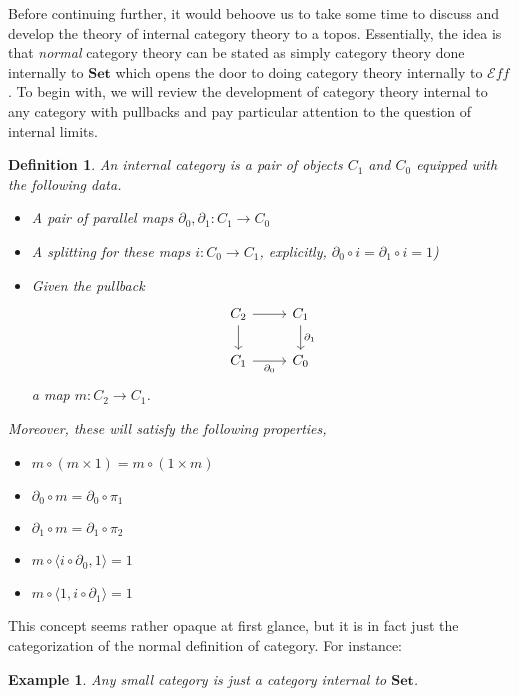 \documentclass[12pt]{amsart}
\newcommand{\cat}[1]{\ensuremath{\mathbf{#1}}}
\newcommand{\set}{\cat{Set}}
\newcommand{\eff}{\mathcal{E}\!f\!f}
\newtheorem{example}[thm]{Example}
\newtheorem{defn}[thm]{Definition}
\begin{document}
Before continuing further, it would behoove us to take some time to
discuss and develop the theory of internal category theory to a
topos. Essentially, the idea is that \emph{normal} category theory can
be stated as simply category theory done internally to $\set$ which
opens the door to doing category theory internally to $\eff$. To begin
with, we will review the development of category theory internal to
any category with pullbacks and pay particular attention to the
question of internal limits.
\begin{defn}\label{defn:internal:internalcat}
  An internal category is a pair of objects $C_1$ and $C_0$ equipped
  with the following data.
  \begin{itemize}
  \item A pair of parallel maps $\partial_0, \partial_1 : C_1 \to C_0$
  \item A splitting for these maps $i : C_0 \to C_1$, explicitly,
    $\partial_0 \circ i = \partial_1 \circ i = 1$)
  \item Given the pullback
    \[
      \begin{tikzcd}
        C_2 \ar[r] \ar[d] & C_1 \ar[d, "\partial_1"]\\
        C_1 \ar[r, swap, "\partial_0"] & C_0
      \end{tikzcd}
    \]
    a map $m : C_2 \to C_1$.
  \end{itemize}
  Moreover, these will satisfy the following properties,
  \begin{itemize}
  \item $m \circ (m \times 1) = m \circ (1 \times m)$
  \item $\partial_0 \circ m = \partial_0 \circ \pi_1$
  \item $\partial_1 \circ m = \partial_1 \circ \pi_2$
  \item $m \circ \langle i \circ \partial_0, 1\rangle = 1$
  \item $m \circ \langle 1, i \circ \partial_1\rangle = 1$
  \end{itemize}
\end{defn}
This concept seems rather opaque at first glance, but it is in fact
just the categorization of the normal definition of category. For
instance:
\begin{example}
  Any small category is just a category internal to $\set$.
\end{example}
\end{document}
